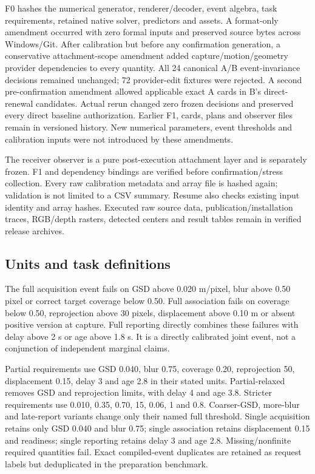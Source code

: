 F0 hashes the numerical generator, renderer/decoder, event algebra, task requirements, retained native solver, predictors and assets. A format-only amendment occurred with zero formal inputs and preserved source bytes across Windows/Git. After calibration but before any confirmation generation, a conservative attachment-scope amendment added capture/motion/geometry provider dependencies to every quantity. All 24 canonical A/B event-invariance decisions remained unchanged; 72 provider-edit fixtures were rejected. A second pre-confirmation amendment allowed applicable exact A cards in B's direct-renewal candidates. Actual rerun changed zero frozen decisions and preserved every direct baseline authorization. Earlier F1, cards, plans and observer files remain in versioned history. New numerical parameters, event thresholds and calibration inputs were not introduced by these amendments.

The receiver observer is a pure post-execution attachment layer and is separately frozen. F1 and dependency bindings are verified before confirmation/stress collection. Every raw calibration metadata and array file is hashed again; validation is not limited to a CSV summary. Resume also checks existing input identity and array hashes. Executed raw source data, publication/installation traces, RGB/depth rasters, detected centers and result tables remain in verified release archives.

\subsection{Units and task definitions}
The full acquisition event fails on GSD above 0.020 m/pixel, blur above 0.50 pixel or correct target coverage below 0.50. Full association fails on coverage below 0.50, reprojection above 30 pixels, displacement above 0.10 m or absent positive version at capture. Full reporting directly combines these failures with delay above 2 s or age above 1.8 s. It is a directly calibrated joint event, not a conjunction of independent marginal claims.

Partial requirements use GSD 0.040, blur 0.75, coverage 0.20, reprojection 50, displacement 0.15, delay 3 and age 2.8 in their stated units. Partial-relaxed removes GSD and reprojection limits, with delay 4 and age 3.8. Stricter requirements use 0.010, 0.35, 0.70, 15, 0.06, 1 and 0.8. Coarser-GSD, more-blur and late-report variants change only their named full threshold. Single acquisition retains only GSD 0.040 and blur 0.75; single association retains displacement 0.15 and readiness; single reporting retains delay 3 and age 2.8. Missing/nonfinite required quantities fail. Exact compiled-event duplicates are retained as request labels but deduplicated in the preparation benchmark.

